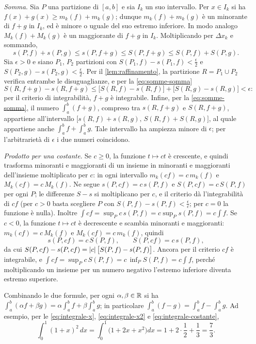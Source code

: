 \begin{dimostrazione}
\emph{Somma.} Sia $P$ una partizione di $[a,b]$ e sia $I_{k}$ un suo intervallo. Per
$x\in I_{k}$ si ha $f(x)+g(x)\ge m_{k}(f)+m_{k}(g)$; dunque $m_{k}(f)+m_{k}(g)$ è un
minorante di $f+g$ in $I_{k}$, ed è minore o uguale del suo estremo inferiore. In modo
analogo $M_{k}(f)+M_{k}(g)$ è un maggiorante di $f+g$ in $I_{k}$. Moltiplicando per
$\Delta x_{k}$ e sommando,
\begin{equation}\label{eq:somme-somma}
  s(P,f)+s(P,g)\le s(P,f+g)\le S(P,f+g)\le S(P,f)+S(P,g) .
\end{equation}
Sia $\epsilon>0$ e siano $P_{1}$, $P_{2}$ partizioni con
$S(P_{1},f)-s(P_{1},f)<\frac\epsilon2$ e $S(P_{2},g)-s(P_{2},g)<\frac\epsilon2$. Per il
\cref{lem:raffinamento}, la partizione $R=P_{1}\cup P_{2}$ verifica entrambe le
disuguaglianze, e per la \eqref{eq:somme-somma}
\[
  S(R,f+g)-s(R,f+g)\le\bigl[S(R,f)-s(R,f)\bigr]+\bigl[S(R,g)-s(R,g)\bigr]<\epsilon :
\]
per il criterio di integrabilità, $f+g$ è integrabile. Infine, per la
\eqref{eq:somme-somma}, il numero $\int_{a}^{b}(f+g)$, compreso tra $s(R,f+g)$ e
$S(R,f+g)$, appartiene all'intervallo $\bigl[s(R,f)+s(R,g),\,S(R,f)+S(R,g)\bigr]$, al
quale appartiene anche $\int_{a}^{b}f+\int_{a}^{b}g$. Tale intervallo ha ampiezza minore
di $\epsilon$; per l'arbitrarietà di $\epsilon$ i due numeri coincidono.

\emph{Prodotto per una costante.} Se $c\ge0$, la funzione $t\mapsto ct$ è crescente, e
quindi trasforma minoranti e maggioranti di un insieme in minoranti e maggioranti
dell'insieme moltiplicato per $c$: in ogni intervallo $m_{k}(cf)=c\,m_{k}(f)$ e
$M_{k}(cf)=c\,M_{k}(f)$. Ne segue $s(P,cf)=c\,s(P,f)$ e $S(P,cf)=c\,S(P,f)$ per ogni $P$; le
differenze $S-s$ si moltiplicano per $c$, e il criterio dà l'integrabilità di $cf$
(per $c>0$ basta scegliere $P$ con $S(P,f)-s(P,f)<\frac\epsilon c$; per $c=0$ la funzione
è nulla). Inoltre $\int cf=\sup_{P}c\,s(P,f)=c\sup_{P}s(P,f)=c\int f$. Se $c<0$, la
funzione $t\mapsto ct$ è decrescente e scambia minoranti e maggioranti: $m_{k}(cf)=c\,
M_{k}(f)$ e $M_{k}(cf)=c\,m_{k}(f)$, quindi
\[
  s(P,cf)=c\,S(P,f), \qquad S(P,cf)=c\,s(P,f),
\]
da cui $S(P,cf)-s(P,cf)=\lvert c\rvert\,\bigl[S(P,f)-s(P,f)\bigr]$.
Ancora per il criterio $cf$ è integrabile, e
$\int cf=\sup_{P}c\,S(P,f)=c\,\inf_{P}S(P,f)=c\int f$, perché moltiplicando un insieme per
un numero negativo l'estremo inferiore diventa estremo superiore.
\end{dimostrazione}

Combinando le due formule, per ogni $\alpha,\beta\in\mathbb{R}$ si ha
$\int_{a}^{b}(\alpha f+\beta g)=\alpha\int_{a}^{b}f+\beta\int_{a}^{b}g$; in particolare
$\int_{a}^{b}(f-g)=\int_{a}^{b}f-\int_{a}^{b}g$. Ad esempio, per le \eqref{eq:integrale-x},
\eqref{eq:integrale-x2} e \eqref{eq:integrale-costante},
\[
  \int_{0}^{1}(1+x)^{2}\,dx=\int_{0}^{1}\bigl(1+2x+x^{2}\bigr)dx
  =1+2\cdot\frac12+\frac13=\frac73 .
\]

